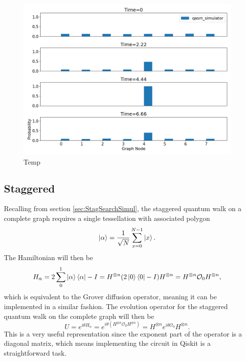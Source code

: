 \documentclass[../../dissertation.tex]{subfiles}
\begin{document}
\begin{figure}[!h]
	\centering
	\includegraphics[scale=0.40]{img/Qiskit/ContQuantumWalk/Search/ContQW_N3_S2.png}
	\caption{Temp}
	\label{fig:contSearchResultCircQistkit}
\end{figure}

\subsection{Staggered}
Recalling from section \ref{sec:StagSearchSimul}, the staggered quantum walk on
a complete graph requires a single tessellation with associated polygon
\begin{equation}
	\ket{\alpha} = \frac{1}{\sqrt{N}} \sum_{x=0}^{N-1} \ket{x}.
\end{equation}
The Hamiltonian will then be 
\begin{equation}
	H_\alpha = 2\sum_0^1\ket{\alpha}\bra{\alpha} - I = H^{\otimes n} (2\ket{0}\bra{0} - I) H^{\otimes n} = H^{\otimes n} \mathcal{O}_0 H^{\otimes n},
\end{equation}
which is equivalent to the Grover diffusion operator, meaning it can be
implemented in a similar fashion. The evolution operator for the staggered
quantum walk on the complete graph will then be 
\begin{equation}
	U = e^{i\theta H_\alpha} = e^{i\theta(H^{\otimes n} \mathcal{O}_0 H^{\otimes n})} = H^{\otimes n} e^{i\theta\mathcal{O}_0} H^{\otimes n}.
	\label{eq:unmodEvolOperatorStagSearch}
\end{equation}
This is a very useful representation since the exponent part of the operator is
a diagonal matrix, which means implementing the circuit in Qiskit is a
straightforward task.\par 
\end{document}

